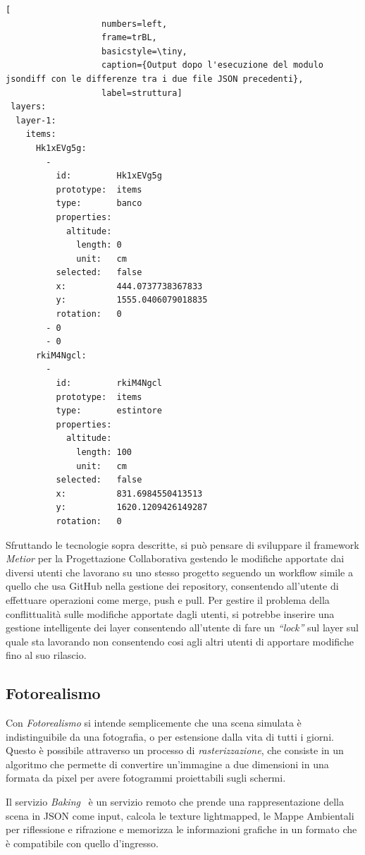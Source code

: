 \begin{lstlisting}[
                   numbers=left,
                   frame=trBL,
                   basicstyle=\tiny,
                   caption={Output dopo l'esecuzione del modulo jsondiff con le differenze tra i due file JSON precedenti},
                   label=struttura]
 layers:
  layer-1:
    items:
      Hk1xEVg5g:
        -
          id:         Hk1xEVg5g
          prototype:  items
          type:       banco
          properties:
            altitude:
              length: 0
              unit:   cm
          selected:   false
          x:          444.0737738367833
          y:          1555.0406079018835
          rotation:   0
        - 0
        - 0
      rkiM4Ngcl:
        -
          id:         rkiM4Ngcl
          prototype:  items
          type:       estintore
          properties:
            altitude:
              length: 100
              unit:   cm
          selected:   false
          x:          831.6984550413513
          y:          1620.1209426149287
          rotation:   0
\end{lstlisting}

Sfruttando le tecnologie sopra descritte, si può pensare di sviluppare il framework \emph{Metior}
per la Progettazione Collaborativa gestendo le modifiche apportate dai diversi utenti che lavorano su uno
stesso progetto seguendo un workflow simile a quello che usa GitHub nella gestione dei repository,
consentendo all'utente di effettuare operazioni come merge, push e pull.
Per gestire il problema della conflittualità sulle modifiche apportate dagli utenti,
si potrebbe inserire una gestione intelligente dei layer consentendo all'utente di fare un \emph{``lock''} sul layer sul quale
sta lavorando non consentendo cosi agli altri utenti di apportare modifiche fino al suo rilascio.
\newpage

\subsection{Fotorealismo}
\label{sec:conclusions_section_2_sub_3}
Con \emph{Fotorealismo} si intende semplicemente che una scena simulata \`e indistinguibile da una fotografia, o per estensione
dalla vita di tutti i giorni. Questo è possibile attraverso un processo di \emph{rasterizzazione}, che consiste in un algoritmo che
permette di convertire un'immagine a due dimensioni in una formata da pixel per avere fotogrammi proiettabili sugli schermi.

Il servizio \emph{Baking}~\cite{Spini:2016:WIA:2945292.2945309} \`e un servizio remoto che prende una rappresentazione della scena in JSON come input,
calcola le texture lightmapped, le Mappe Ambientali per riflessione e rifrazione e memorizza le informazioni grafiche
in un formato che \`e compatibile con quello d'ingresso.\\

